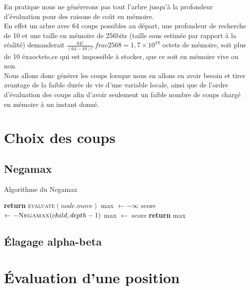 \documentclass{article}
\begin{document}
En pratique nous ne générerons pas tout l'arbre jusqu'à la profondeur d'évaluation pour des raisons de coût en mémoire.\\
En effet un arbre avec 64 coups possibles au départ, une profondeur de recherche de 10 et une taille en mémoire de 256bits
(taille sous estimée par rapport à la réalité) demanderait $ \frac{64!}{(64-10)!}.frac{256}{8} = 1,7\times 10^{19}$ octets de mémoire, 
soit plus de 10 éxaoctets,ce qui est impossible à stocker, que ce soit en mémoire vive ou non.\\
Nous allons donc générer les coups lorsque nous en allons en avoir besoin et tirer avantage de la faible durée de vie d'une variable locale, ainsi
que de l'ordre d'évaluation des coups afin d'avoir seulement un faible nombre de coups chargé en mémoire à un instant donné.

\pagebreak
\section{Choix des coups}
\subsection{Negamax}

\begin{algorithm}
\caption{Algorithme du Negamax}\label{negamax}
\begin{algorithmic}[1]
		\State \textbf{return} \textsc{evaluate}$(node.move)$
	\EndIf
	\State max $\gets -\infty$
		\State score $\gets -\textsc{Negamax}(child, depth -1)$
			\State max $\gets$ score
		\EndIf
	\EndFor
	\State \textbf{return} max
\EndProcedure
\end{algorithmic}
\end{algorithm}


\subsection{Élagage alpha-beta}
\pagebreak
\section{Évaluation d'une position}
\end{document}
